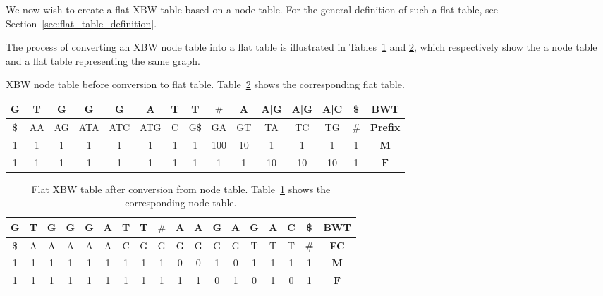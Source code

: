 \documentclass[a4paper,12pt,twoside,BCOR=10mm]{scrbook}
\begin{document}
We now wish to create a flat XBW table based on a node table.
For the general definition of such a flat table, see Section~\ref{sec:flat_table_definition}.

The process of converting an XBW node table into a flat table is illustrated in Tables~\ref{table:evo_node_to_flat_node}
and \ref{table:evo_node_to_flat_flat}, which respectively show the a node table and a flat table representing the same graph. \\
{
\renewcommand{\tabcolsep}{5pt}
\begin{table}[htb]
\centering
\caption[XBW node table before conversion to flat table]{XBW node table before conversion to flat table.
Table~\ref{table:evo_node_to_flat_flat} shows the corresponding flat table.}
\begin{tabular}{ | c | c | c | c | c | c | c | c | c | c | c | c | c | c | c | }
\hline
G & T & G & G & G & A & T & T & $\#$ & A & A|G & A|G & A|C & \$ & \textbf{BWT} \\ \hline
\$ & AA & AG & ATA & ATC & ATG & C & G\$ & GA & GT & TA & TC & TG & $\#$ & \textbf{Prefix} \\ \hline
1 & 1 & 1 & 1 & 1 & 1 & 1 & 1 & 100 & 10 & 1 & 1 & 1 & 1 & $\boldsymbol{M}$ \\ \hline
1 & 1 & 1 & 1 & 1 & 1 & 1 & 1 & 1 & 1 & 10 & 10 & 10 & 1 & $\boldsymbol{F}$ \\ \hline
\end{tabular}
\label{table:evo_node_to_flat_node}
\end{table}
}
\begin{table}[htb]
\centering
\caption[Flat XBW table after conversion from node table]{Flat XBW table after conversion from node table.
Table~\ref{table:evo_node_to_flat_node} shows the corresponding node table.}
\begin{tabular}{ | c | c | c | c | c | c | c | c | c | c | c | c | c | c | c | c | c | c | }
\hline
G & T & G & G & G & A & T & T & $\#$ & A & A & G & A & G & A & C & \$ & \textbf{BWT} \\ \hline
\$ & A & A & A & A & A & C & G & G & G & G & G & G & T & T & T & $\#$ & \textbf{FC} \\ \hline
1 & 1 & 1 & 1 & 1 & 1 & 1 & 1 & 1 & 0 & 0 & 1 & 0 & 1 & 1 & 1 & 1 & $\boldsymbol{M}$ \\ \hline
1 & 1 & 1 & 1 & 1 & 1 & 1 & 1 & 1 & 1 & 1 & 0 & 1 & 0 & 1 & 0 & 1 & $\boldsymbol{F}$ \\ \hline
\end{tabular}
\label{table:evo_node_to_flat_flat}
\end{table}
\end{document}
